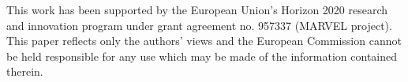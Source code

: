 \documentclass[acmsmall]{acmart}
\begin{document}






\begin{acks}
  This work has been supported by the European Union’s Horizon 2020 research and innovation program under grant agreement no. 957337 (MARVEL project). This paper reflects only the authors' views and the European Commission cannot be held responsible for any use which may be made of the information contained therein.
\end{acks}




%
\end{document}
